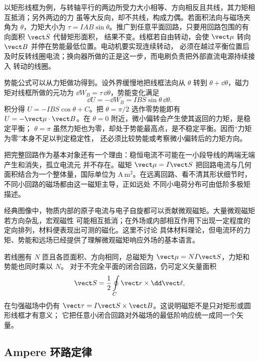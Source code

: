 以矩形线框为例，与转轴平行的两边所受力大小相等、方向相反且共线，其力矩相互抵消；另外两边的力
虽等大反向，却不共线，构成力偶。若面积法向与磁场夹角为 $\theta$，力矩大小为
$\tau=IAB\sin\theta$。推广到任意平面回路，只要用回路包围的有向面积 $\vect S$ 代替矩形面积，
结果不变。线框若自由转动，会使 $\vect\mu$ 转向 $\vect B$ 并停在势能最低位置。电动机要实现连续转动，
必须在越过平衡位置后及时反转线圈电流；换向器所做的正是这一步，而电刷负责把外部直流电源持续接入
转动的线圈。

势能公式可以从力矩做功得到。设外界缓慢地把线框法向从 $\theta$ 转到
$\theta+\dd\theta$，磁力矩对线框所做的元功为 $\dd W_B=\tau\,\dd\theta$，势能变化满足
\begin{equation}
  \dd U=-\dd W_B=IBS\sin\theta\,\dd\theta.
\end{equation}
积分得 $U=-IBS\cos\theta+C$。把 $\theta=\pi/2$ 选作零势能即有
$U=-\vect\mu\cdot\vect B$。在 $\theta=0$ 附近，微小偏转会产生使其返回的力矩，是稳定平衡；
$\theta=\pi$ 虽然力矩也为零，却处于势能最高点，是不稳定平衡。因而“力矩为零”本身不足以判定稳定性，
还必须比较势能或考察微小偏转后的力矩方向。

把完整回路作为基本对象还有一个理由：稳恒电流不可能在一小段导线的两端无端产生和消失，孤立电流元
并不存在。磁矩 $\vect\mu=I\vect S$ 把回路电流与几何面积结合为一个整体量，国际单位为
$\mathrm{A\,m^2}$。在远离回路、看不清其形状细节时，不同小回路的磁场都由这一磁矩主导，正如远处
不同小电荷分布可由低阶多极矩描述。

经典图像中，物质内部的原子电流与电子自旋都可以贡献微观磁矩。大量微观磁矩若方向杂乱，宏观磁性
可能相互抵消；在外场或内部相互作用下出现一定程度的定向排列，材料便表现出可测的磁化。这里不讨论
具体材料理论，但电流环的力矩、势能和远场已经提供了理解微观磁矩响应外场的基本语言。

若线圈有 $N$ 匝且各匝面积、方向相同，总磁矩为 $\vect\mu=NI\vect S$，力矩和势能也同时乘以 $N$。
对于不完全平面的闭合回路，仍可定义矢量面积
\begin{equation}
  \vect S=\frac12\oint\limits_C\vect r\times\dd\vect\ell,
\end{equation}
在匀强磁场中仍有 $\vect\tau=I\vect S\times\vect B$。这说明磁矩不是只对矩形或圆形线框才有意义；
它把任意小闭合回路对外磁场的最低阶响应统一成同一个矢量。

\loopTorqueDiagram

\subsection*{Ampere 环路定律}

